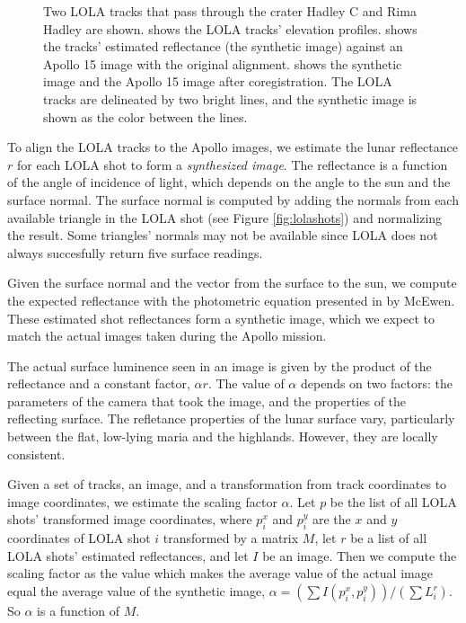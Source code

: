 \begin{figure}
{	\label{fig:hadleyadjusted}}
	\caption{Two LOLA tracks that pass through the crater Hadley C and Rima Hadley are
		shown.  shows the LOLA tracks' elevation profiles.
		 shows the tracks' estimated reflectance (the synthetic
		image) against an Apollo 15 image with the original alignment.
		 shows the synthetic image and the Apollo 15 image after
		coregistration. The LOLA tracks are delineated by two bright lines, and the synthetic
		image is shown as the color between the lines.}
	\label{fig:problem}
\end{figure}

To align the LOLA tracks to the Apollo images, we estimate the lunar reflectance $r$ for each LOLA
shot to form a \emph{synthesized image}. The reflectance is a function of the angle of incidence
of light, which depends on the angle to the sun and the surface normal. The surface normal
is computed by adding the normals from each available triangle in the LOLA shot (see Figure \ref{fig:lolashots})
and normalizing the result. Some triangles' normals may not be available since LOLA does not always
succesfully return five surface readings.

Given the surface normal and the vector from the surface to the sun, we compute the expected reflectance with
the photometric equation presented in by McEwen. These estimated shot reflectances form
a synthetic image, which we expect to match the actual images taken during the Apollo mission.

The actual surface luminence seen in an image is given by the product of the reflectance and a constant factor, %
$\alpha r$. The value of $\alpha$ depends on two factors: the parameters of the camera that took the image,
and the properties of the reflecting surface. The refletance properties of the lunar surface vary, particularly
between the flat, low-lying maria and the highlands. However, they are locally consistent.

Given a set of tracks, an image, and a transformation from track coordinates to image coordinates, we estimate the scaling factor $\alpha$.
Let $p$ be the list of all LOLA shots' transformed image coordinates, where $p_i^x$ and $p_i^y$ are the $x$ and $y$
coordinates of LOLA shot $i$ transformed by a matrix $M$, let $r$ be a list of all LOLA shots' estimated reflectances, and let $I$ be an image.
Then we compute the scaling
factor as the value which makes the average value of the actual image equal the 
average value of the synthetic image, $\alpha = \left(\sum I(p_i^x, p_i^y)\right) / \left(\sum L_i^r\right)$.
So $\alpha$ is a function of $M$.

